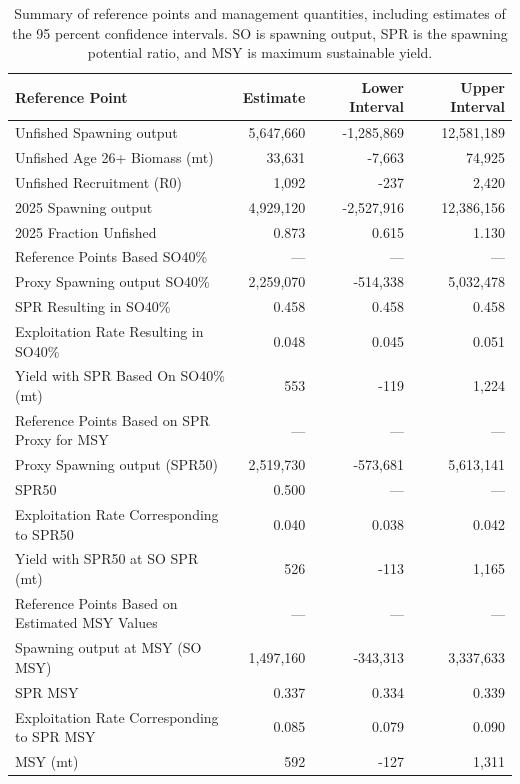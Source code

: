 \documentclass[
]{scrartcl}
\begin{document}
\endgroup

\newpage{}

\begingroup
\fontsize{9.0pt}{10.8pt}\selectfont

\begin{longtable}{lrrr}

\caption{\label{tbl-ref-points}Summary of reference points and
management quantities, including estimates of the 95 percent confidence
intervals. SO is spawning output, SPR is the spawning potential ratio,
and MSY is maximum sustainable yield.}

\tabularnewline

\toprule
Reference Point & Estimate & Lower Interval & Upper Interval \\ 
\midrule\addlinespace[2.5pt]
Unfished Spawning output & 5,647,660 & -1,285,869 & 12,581,189 \\ 
Unfished Age 26+ Biomass (mt) & 33,631 & -7,663 & 74,925 \\ 
Unfished Recruitment (R0) & 1,092 & -237 & 2,420 \\ 
2025 Spawning output & 4,929,120 & -2,527,916 & 12,386,156 \\ 
2025 Fraction Unfished & 0.873 & 0.615 & 1.130 \\ 
Reference Points Based SO40\% & — & — & — \\ 
Proxy Spawning output SO40\% & 2,259,070 & -514,338 & 5,032,478 \\ 
SPR Resulting in SO40\% & 0.458 & 0.458 & 0.458 \\ 
Exploitation Rate Resulting in SO40\% & 0.048 & 0.045 & 0.051 \\ 
Yield with SPR Based On SO40\% (mt) & 553 & -119 & 1,224 \\ 
Reference Points Based on SPR Proxy for MSY & — & — & — \\ 
Proxy Spawning output (SPR50) & 2,519,730 & -573,681 & 5,613,141 \\ 
SPR50 & 0.500 & — & — \\ 
Exploitation Rate Corresponding to SPR50 & 0.040 & 0.038 & 0.042 \\ 
Yield with SPR50 at SO SPR (mt) & 526 & -113 & 1,165 \\ 
Reference Points Based on Estimated MSY Values & — & — & — \\ 
Spawning output at MSY (SO MSY) & 1,497,160 & -343,313 & 3,337,633 \\ 
SPR MSY & 0.337 & 0.334 & 0.339 \\ 
Exploitation Rate Corresponding to SPR MSY & 0.085 & 0.079 & 0.090 \\ 
MSY (mt) & 592 & -127 & 1,311 \\ 
\bottomrule

\end{longtable}
\end{document}
